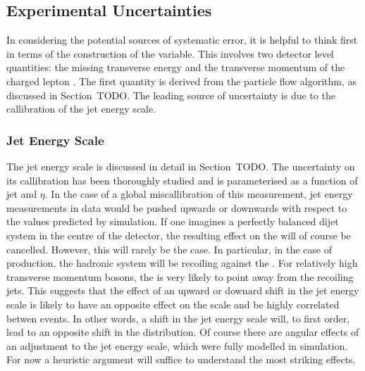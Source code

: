 \subsection{Experimental Uncertainties}
In considering the potential sources of systematic error, it is helpful to think
first in terms of the construction of the \LP variable. This involves two
detector level quantities: the missing transverse energy \MET and the transverse
momentum of the charged lepton \Ptl. The first quantity is derived from the
particle flow algorithm, as discussed in Section~TODO. The leading source of
uncertainty is due to the callibration of the jet energy scale.

\subsubsection{Jet Energy Scale}
The jet energy scale is discussed in detail in Section~TODO. The uncertainty on
its callibration has been thoroughly studied and is parameterised as a function
of jet \Pt and $\eta$. In the case of a global miscallibration of this
measurement, jet energy measurements in data would be pushed upwards or
downwards with respect to the values predicted by simulation. If one imagines a
perfectly balanced dijet system in the centre of the detector, the resulting
effect on the \MET will of course be cancelled. However, this will rarely be the
case. In particular, in the case of \Wjets production, the hadronic system will
be recoiling against the \PW. For relatively high transverse momentum \PW
bosons, the \MET is very likely to point away from the recoiling jets. This
suggests that the effect of an upward or downard shift in the jet energy scale
is likely to have an opposite effect on the \MET scale and be highly correlated
betwen events. In other words, a shift in the jet energy scale will, to first
order, lead to an opposite shift in the \MET distribution. Of course there are
angular effects of an adjustment to the jet energy scale, which were fully
modelled in simulation. For now a heuristic argument will suffice to understand
the most striking effects.


